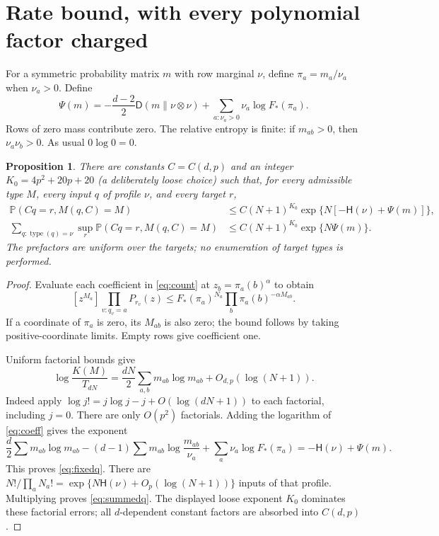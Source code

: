 \documentclass[11pt]{article}
\newtheorem{proposition}{Proposition}
\newcommand{\Prob}{\mathbb P}
\newcommand{\Ent}{\mathsf H}
\newcommand{\KL}{\mathsf D}
\begin{document}
\section{Rate bound, with every polynomial factor charged}
For a symmetric probability matrix $m$ with row marginal $\nu$, define
$\pi_a=m_a/\nu_a$ when $\nu_a>0$. Define
\[
 \Psi(m)=-\frac{d-2}{2}\KL(m\|\nu\otimes\nu)
            +\sum_{a:\nu_a>0}\nu_a\log F_*(\pi_a).
 \tag{3}\label{eq:rate}
\]
Rows of zero mass contribute zero. The relative entropy is finite:
if $m_{ab}>0$, then $\nu_a\nu_b>0$. As usual $0\log0=0$.

\begin{proposition}\label{prop:typebound}
There are constants $C=C(d,p)$ and an integer
$K_0=4p^2+20p+20$ (a deliberately loose choice) such that, for every
admissible type $M$, every input $q$ of profile $\nu$, and every target $r$,
\begin{align}
 \Prob(Cq=r,M(q,C)=M)
 &\le C(N+1)^{K_0}
          \exp\{N[-\Ent(\nu)+\Psi(m)]\},\label{eq:fixedq}\\
 \sum_{q:\operatorname{type}(q)=\nu}
       \sup_r\Prob(Cq=r,M(q,C)=M)
 &\le C(N+1)^{K_0}\exp\{N\Psi(m)\}.
 \label{eq:summedq}
\end{align}
The prefactors are uniform over the targets; no enumeration of target
types is performed.
\end{proposition}
\begin{proof}
Evaluate each coefficient in \eqref{eq:count} at
$z_b=\pi_a(b)^\alpha$ to obtain
\[
 [z^{M_a}]\prod_{v:q_v=a}P_{r_v}(z)
 \le F_*(\pi_a)^{N_a}\prod_b\pi_a(b)^{-\alpha M_{ab}}.
 \tag{4}\label{eq:coeff}
\]
If a coordinate of $\pi_a$ is zero, its $M_{ab}$ is also zero;
the bound follows by taking positive-coordinate limits. Empty rows
give coefficient one.

Uniform factorial bounds give
\[
 \log\frac{K(M)}{T_{dN}}
   =\frac{dN}{2}\sum_{a,b}m_{ab}\log m_{ab}
           +O_{d,p}(\log(N+1)).
\]
Indeed apply $\log j!=j\log j-j+O(\log(dN+1))$ to each factorial,
including $j=0$. There are only $O(p^2)$ factorials. Adding the
logarithm of \eqref{eq:coeff} gives the exponent
\[
 \frac d2\sum m_{ab}\log m_{ab}
  -(d-1)\sum m_{ab}\log\frac{m_{ab}}{\nu_a}
  +\sum_a\nu_a\log F_*(\pi_a)
  =-\Ent(\nu)+\Psi(m).
\]
This proves \eqref{eq:fixedq}. There are
$N!/\prod_aN_a!=\exp\{N\Ent(\nu)+O_p(\log(N+1))\}$ inputs of
that profile. Multiplying proves \eqref{eq:summedq}.
The displayed loose exponent $K_0$ dominates these factorial errors;
all $d$-dependent constant factors are absorbed into $C(d,p)$.
\end{proof}
\end{document}
